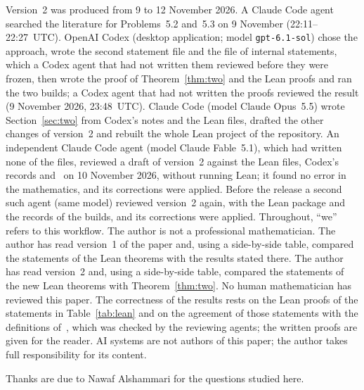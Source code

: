 \documentclass[11pt]{article}
\theoremstyle{remark}
\begin{document}
Version~2 was produced from 9 to 12 November 2026. A Claude Code agent
searched the literature for Problems~5.2 and~5.3 on 9 November (22:11--22:27~UTC).
OpenAI Codex (desktop application; model \texttt{gpt-6.1-sol}) chose the
approach, wrote the second statement file and the file of internal statements,
which a Codex agent that had not written them reviewed before they were frozen,
then wrote the proof of Theorem~\ref{thm:two} and the Lean proofs and ran the
two builds; a Codex agent that had not written the proofs reviewed the result
(9 November 2026, 23:48~UTC). Claude Code (model Claude Opus~5.5) wrote
Section~\ref{sec:two} from Codex's notes and the Lean files, drafted the other
changes of version~2 and rebuilt the whole Lean project of the repository.
An independent Claude Code agent (model Claude Fable~5.1), which had written none
of the files, reviewed a draft of version~2 against the Lean files, Codex's
records and~\cite{alsh} on 10 November 2026, without running Lean; it found no
error in the mathematics, and its corrections were applied. Before the release a
second such agent (same model) reviewed version~2 again, with the Lean package
and the records of the builds, and its corrections were applied.
Throughout, ``we'' refers to this workflow. The author is not a professional
mathematician.
The author has read version~1 of the paper and, using a side-by-side table,
compared the statements of the Lean theorems with the results stated there.
The author has read version~2 and, using a side-by-side table, compared the
statements of the new Lean theorems with Theorem~\ref{thm:two}.
No human mathematician has reviewed this paper. The correctness of the
results rests on the Lean proofs of the statements in Table~\ref{tab:lean}
and on the agreement of those statements with the definitions
of~\cite{alsh}, which was checked by the reviewing agents; the written proofs
are given for the reader. AI systems are not authors of this paper; the
author takes full responsibility for its content.

\medskip
\noindent Thanks are due to Nawaf Alshammari for the questions studied here.
\end{document}
